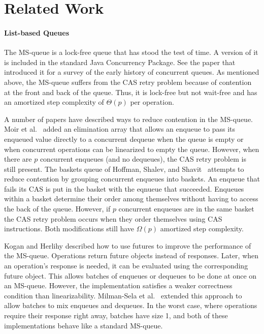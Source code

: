 
\section{Related Work}

\paragraph{List-based Queues}
The MS-queue \cite{MS98} is a lock-free queue that has stood the test of time.
A version of it is
included in the standard Java Concurrency Package.  %
See the paper that introduced it for a survey of the early history of concurrent queues.
As mentioned above, the MS-queue suffers from the CAS retry problem because of contention at the front and back of the queue.
Thus, it is lock-free but not wait-free and has an amortized step complexity
of $\Theta(p)$ per operation.

A number of papers have described ways to reduce contention in the MS-queue.
Moir et al.~\cite{DBLP:conf/spaa/MoirNSS05} 
added an elimination array that allows an enqueue to pass its enqueued value directly
to a concurrent dequeue when the queue is empty or when concurrent operations 
can be linearized to empty the queue.
However, when there are $p$ concurrent enqueues (and no dequeues), the CAS retry problem
is still present.
The baskets queue of
Hoffman, Shalev, and Shavit~\cite{DBLP:conf/opodis/HoffmanSS07} 
attempts to reduce contention by grouping concurrent enqueues into baskets.
An enqueue that fails its CAS is put in the basket with the eqnueue that succeeded.
Enqueues within a basket determine their order among themselves without having to access the back of the queue.
However, if $p$ concurrent enqueues are in the same basket
the CAS retry problem occurs when they order themselves using CAS instructions.
Both modifications still have $\Omega(p)$ amortized step complexity.

Kogan and Herlihy \cite{DBLP:conf/podc/KoganH14} described how to use futures to improve
the performance of the MS-queue.
Operations return future
objects instead of responses. Later, when an operation's response is needed, it
can be evaluated using the corresponding future object.
This allows batches of enqueues or dequeues to be done at once on an MS-queue.
However, the implementation satisfies a weaker correctness condition than linearizability.
Milman-Sela et al.~\cite{MKLLP22} extended this approach to allow batches
to mix enqueues and dequeues.
In the worst case, where operations require their response right away,
batches have size 1, and both of these implementations behave like a standard MS-queue.

